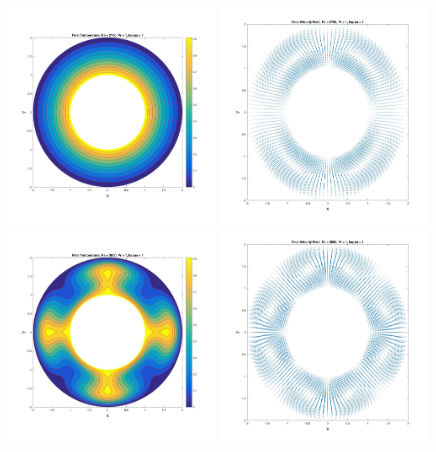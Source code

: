 \documentclass{article}
\begin{document}
	\begin{figure}[h!]
		\centering
		\includegraphics[width = 0.49\textwidth]{fig_q4ra2750}
		\includegraphics[width = 0.49\textwidth]{fig_q4ura2750}
		\includegraphics[width = 0.49\textwidth]{fig_q4ra3000}
		\includegraphics[width = 0.49\textwidth]{fig_q4ura3000}

\end{figure}
\end{document}
